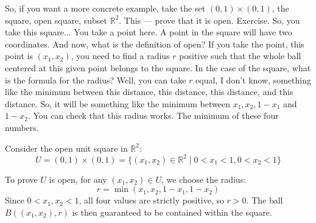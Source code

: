 \begin{spoken-clean}[00:07:10 - 00:08:37]
So, if you want a more concrete example, take the set $(0, 1) \times (0, 1)$, the square, open square, subset $\mathbb{R}^2$. This --- prove that it is open. Exercise. So, you take this square...  You take a point here. A point in the square will have two coordinates. And now, what is the definition of open? If you take the point, this point is $(x_1, x_2)$, you need to find a radius $r$ positive such that the whole ball centered at this given point belongs to the square. In the case of the square, what is the formula for the radius? Well, you can take $r$ equal, I don't know, something like the minimum between this distance, this distance, this distance, and this distance. So, it will be something like the minimum between $x_1, x_2, 1 - x_1$ and $1 - x_2$. You can check that this radius works. The minimum of these four numbers.
\end{spoken-clean}

\begin{math-stroke}
Consider the open unit square in $\mathbb{R}^2$:
\[ U = (0, 1) \times (0, 1) = \{ (x_1, x_2) \in \mathbb{R}^2 \mid 0 < x_1 < 1, 0 < x_2 < 1 \} \]
\begin{center}
\end{center}
\begin{explanation-of-steps}
To prove $U$ is open, for any $(x_1, x_2) \in U$, we choose the radius:
\[ r = \min(x_1, x_2, 1 - x_1, 1 - x_2) \]
Since $0 < x_1, x_2 < 1$, all four values are strictly positive, so $r > 0$. The ball $B((x_1, x_2), r)$ is then guaranteed to be contained within the square.
\end{explanation-of-steps}
\end{math-stroke}

